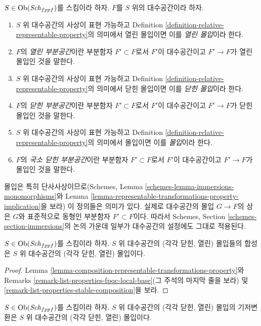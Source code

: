 \begin{definition}
\label{definition-immersion}
$S \in \mathop{\mathrm{Ob}}\nolimits(\mathit{Sch}_{fppf})$를 스킴이라 하자.
$F$를 $S$ 위의 대수공간이라 하자.
\begin{enumerate}
\item $S$ 위 대수공간의 사상이 표현 가능하고 Definition
\ref{definition-relative-representable-property}의 의미에서 열린
몰입이면 이를 {\it 열린 몰입}이라 한다.
\item $F$의 {\it 열린 부분공간}이란 부분함자 $F' \subset F$로서
$F'$이 대수공간이고 $F' \to F$가 열린 몰입인 것을 말한다.
\item $S$ 위 대수공간의 사상이 표현 가능하고 Definition
\ref{definition-relative-representable-property}의 의미에서 닫힌
몰입이면 이를 {\it 닫힌 몰입}이라 한다.
\item $F$의 {\it 닫힌 부분공간}이란 부분함자 $F' \subset F$로서
$F'$이 대수공간이고 $F' \to F$가 닫힌 몰입인 것을 말한다.
\item $S$ 위 대수공간의 사상이 표현 가능하고 Definition
\ref{definition-relative-representable-property}의 의미에서 몰입이면
이를 {\it 몰입}이라 한다.
\item $F$의 {\it 국소 닫힌 부분공간}이란 부분함자 $F' \subset F$로서
$F'$이 대수공간이고 $F' \to F$가 몰입인 것을 말한다.
\end{enumerate}
\end{definition}

\noindent
몰입은 특히 단사사상이므로(Schemes, Lemma
\ref{schemes-lemma-immersions-monomorphisms}와 Lemma
\ref{lemma-representable-transformations-property-implication}을 보라)
이 정의들은 의미가 있다. 실제로 대수공간의 몰입 $G \to F$의 상은
$G$와 표준적으로 동형인 부분함자 $F' \subset F$이다. 따라서 Schemes,
Section \ref{schemes-section-immersions}의 논의 가운데 일부가
대수공간의 설정에도 그대로 적용된다.

\begin{lemma}
\label{lemma-composition-immersions}
$S \in \mathop{\mathrm{Ob}}\nolimits(\mathit{Sch}_{fppf})$를 스킴이라 하자.
$S$ 위 대수공간의 (각각 닫힌, 열린) 몰입들의 합성은
$S$ 위 대수공간의 (각각 닫힌, 열린) 몰입이다.
\end{lemma}

\begin{proof}
Lemma \ref{lemma-composition-representable-transformations-property}와
Remarks \ref{remark-list-properties-fpqc-local-base}(그 주석의 마지막
줄을 보라) 및 \ref{remark-list-properties-stable-composition}을 보라.
\end{proof}

\begin{lemma}
\label{lemma-base-change-immersions}
$S \in \mathop{\mathrm{Ob}}\nolimits(\mathit{Sch}_{fppf})$를 스킴이라 하자.
$S$ 위 대수공간의 (각각 닫힌, 열린) 몰입의 기저변환은
$S$ 위 대수공간의 (각각 닫힌, 열린) 몰입이다.
\end{lemma}


